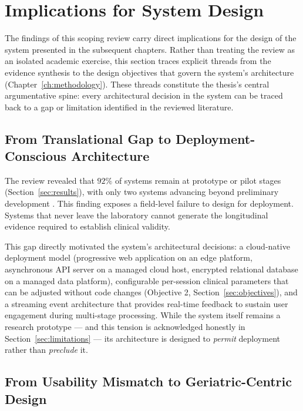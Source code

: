\section{Implications for System Design}
\label{sec:implications}

The findings of this scoping review carry direct implications for the design of the system presented in the subsequent chapters. Rather than treating the review as an isolated academic exercise, this section traces explicit threads from the evidence synthesis to the design objectives that govern the system's architecture (Chapter~\ref{ch:methodology}). These threads constitute the thesis's central argumentative spine: every architectural decision in the system can be traced back to a gap or limitation identified in the reviewed literature.

\subsection{From Translational Gap to Deployment-Conscious Architecture}
\label{sec:gap-to-arch}

The review revealed that $92\%$ of systems remain at prototype or pilot stages (Section~\ref{sec:results}), with only two systems advancing beyond preliminary development \citep{dimartinoMalnutritionRiskAssessment2021,wangAreNutritionalLabeling2024}. This finding exposes a field-level failure to design for deployment. Systems that never leave the laboratory cannot generate the longitudinal evidence required to establish clinical validity.

This gap directly motivated the system's architectural decisions: a cloud-native deployment model (progressive web application on an edge platform, asynchronous API server on a managed cloud host, encrypted relational database on a managed data platform), configurable per-session clinical parameters that can be adjusted without code changes (Objective 2, Section~\ref{sec:objectives}), and a streaming event architecture that provides real-time feedback to sustain user engagement during multi-stage processing. While the system itself remains a research prototype --- and this tension is acknowledged honestly in Section~\ref{sec:limitations} --- its architecture is designed to \emph{permit} deployment rather than \emph{preclude} it.

\subsection{From Usability Mismatch to Geriatric-Centric Design}

